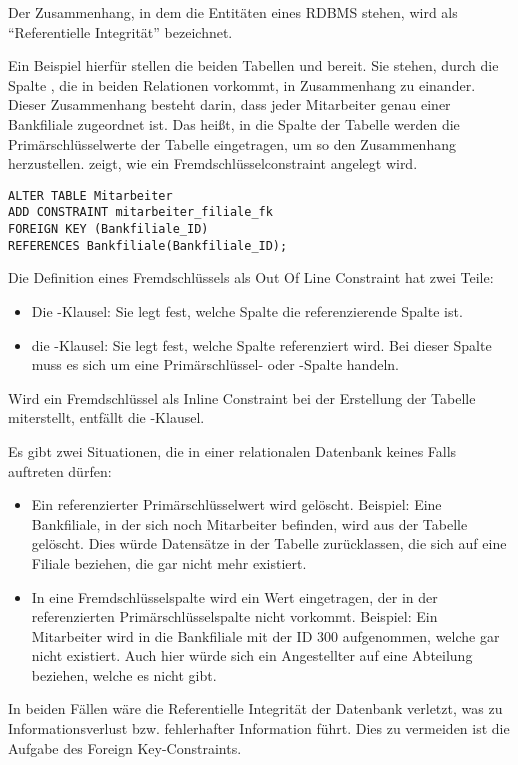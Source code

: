 \begin{merke}
    Der Zusammenhang, in dem die Entitäten eines RDBMS stehen, wird als \enquote{Referentielle Integrität} bezeichnet.
\end{merke}
Ein Beispiel hierfür stellen die beiden Tabellen  und  bereit. Sie stehen, durch die Spalte , die in beiden Relationen vorkommt, in Zusammenhang zu einander. Dieser Zusammenhang besteht darin, dass jeder Mitarbeiter genau einer Bankfiliale zugeordnet ist. Das heißt,  in die Spalte  der Tabelle  werden die Primärschlüsselwerte der Tabelle  eingetragen, um so den Zusammenhang herzustellen.
 zeigt, wie ein Fremdschlüsselconstraint angelegt wird.
\clearpage
\begin{lstlisting}[language=oracle_sql,caption={Ein Foreign Key-Constraint als Out Of Line Constraint anlegen},label=sql09_15]
ALTER TABLE Mitarbeiter
ADD CONSTRAINT mitarbeiter_filiale_fk
FOREIGN KEY (Bankfiliale_ID)
REFERENCES Bankfiliale(Bankfiliale_ID);
        \end{lstlisting}
Die Definition eines Fremdschlüssels als Out Of Line Constraint hat zwei Teile:
\begin{itemize}
    \item Die -Klausel: Sie legt fest, welche Spalte die referenzierende Spalte ist.
    \item die -Klausel: Sie legt fest, welche Spalte referenziert wird. Bei dieser Spalte muss es sich um eine Primärschlüssel- oder \UNIQUE-Spalte handeln.
\end{itemize}
\begin{merke}
    Wird ein Fremdschlüssel als Inline Constraint bei der Erstellung der Tabelle miterstellt, entfällt die -Klausel.
\end{merke}
\begin{merke}
    Es gibt zwei Situationen, die in einer relationalen Datenbank keines Falls auftreten dürfen:
    \begin{itemize}
        \item Ein referenzierter Primärschlüsselwert wird gelöscht. Beispiel: Eine Bankfiliale, in der sich noch Mitarbeiter befinden, wird aus der Tabelle  gelöscht. Dies würde Datensätze in der Tabelle  zurücklassen, die sich auf eine Filiale beziehen, die gar nicht mehr existiert.
        \item In eine Fremdschlüsselspalte wird ein Wert eingetragen, der in der referenzierten Primärschlüsselspalte nicht vorkommt. Beispiel: Ein Mitarbeiter wird in die Bankfiliale mit der ID 300 aufgenommen, welche gar nicht existiert. Auch hier würde sich ein Angestellter auf eine Abteilung beziehen, welche es nicht gibt.
    \end{itemize}
    In beiden Fällen wäre die Referentielle Integrität der Datenbank verletzt, was zu Informationsverlust bzw. fehlerhafter Information führt. Dies zu vermeiden ist die Aufgabe des Foreign Key-Constraints.
\end{merke}
